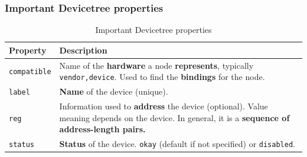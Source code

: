 \documentclass[handout]{beamer}
\begin{document}
\begin{frame}
  \frametitle{Important Devicetree properties}

  \begin{table}
    \centering
    \footnotesize
    \begin{tabular}{lp{}}
      \toprule
      Property            & Description                                        \\
      \midrule
      \texttt{compatible} &                                                    %
      Name of the \textbf{hardware} a node \textbf{represents}, typically
      \texttt{vendor,device}. Used to find the \textbf{bindings} for the node. \\
      \texttt{label}      &                                                    %
      \textbf{Name} of the device (unique).                                    \\
      \texttt{reg}        &                                                    %
      Information used to \textbf{address} the device (optional). Value
      meaning depends on the device. In general, it is a
      \textbf{sequence of address-length pairs.}                               \\
      \texttt{status}     &                                                    %
      \textbf{Status} of the device. \texttt{okay} (default if not specified)
      or \texttt{disabled}.                                                    \\
      \bottomrule
    \end{tabular}
    \caption{Important Devicetree properties}
  \end{table}
\end{frame}
\end{document}
